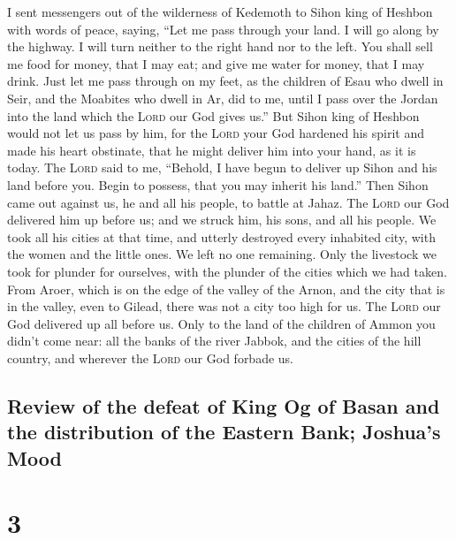  I sent messengers out of the wilderness of Kedemoth to
Sihon king of Heshbon with words of peace, saying,  ``Let
me pass through your land. I will go along by the highway. I will turn
neither to the right hand nor to the left.  You shall
sell me food for money, that I may eat; and give me water for money,
that I may drink. Just let me pass through on my feet, 
as the children of Esau who dwell in Seir, and the Moabites who dwell in
Ar, did to me, until I pass over the Jordan into the land which the
\textsc{Lord} our God gives us.''  But Sihon king of
Heshbon would not let us pass by him, for the \textsc{Lord} your God
hardened his spirit and made his heart obstinate, that he might deliver
him into your hand, as it is today.  The \textsc{Lord}
said to me, ``Behold, I have begun to deliver up Sihon and his land
before you. Begin to possess, that you may inherit his land.''
 Then Sihon came out against us, he and all his people,
to battle at Jahaz.  The \textsc{Lord} our God delivered
him up before us; and we struck him, his sons, and all his people.
 We took all his cities at that time, and utterly
destroyed every inhabited city, with the women and the little ones. We
left no one remaining.  Only the livestock we took for
plunder for ourselves, with the plunder of the cities which we had
taken.  From Aroer, which is on the edge of the valley of
the Arnon, and the city that is in the valley, even to Gilead, there was
not a city too high for us. The \textsc{Lord} our God delivered up all
before us.  Only to the land of the children of Ammon you
didn't come near: all the banks of the river Jabbok, and the cities of
the hill country, and wherever the \textsc{Lord} our God forbade us.

\hypertarget{review-of-the-defeat-of-king-og-of-basan-and-the-distribution-of-the-eastern-bank-joshuas-mood}{%
\subsection{Review of the defeat of King Og of Basan and the
distribution of the Eastern Bank; Joshua's
Mood}\label{review-of-the-defeat-of-king-og-of-basan-and-the-distribution-of-the-eastern-bank-joshuas-mood}}

\hypertarget{section-2}{%
\section{3}\label{section-2}}

